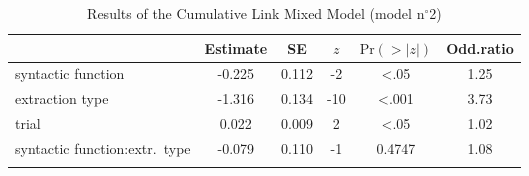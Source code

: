 \begin{table}
\begin{tabularx}{\textwidth}{Q S[table-format=-1.3] S[table-format=1.3] S[table-format=-2] S[table-format=<1.4] S[table-format=1.2]}
  \lsptoprule
 & {Estimate} & {SE} & {$z$} & {$\text{Pr}(>|z|)$} & {Odd.ratio} \\ 
  \midrule
  syntactic function & -0.225 & 0.112 & -2 & <.05 & 1.25 \\ 
  extraction type & -1.316 & 0.134 & -10 & <.001 & 3.73 \\ 
  trial & 0.022 & 0.009 & 2 & <.05 & 1.02 \\ 
  syntactic function:extr.\ type & -0.079 & 0.110 & -1 & 0.4747 & 1.08 \\ 
   \lspbottomrule
\end{tabularx}
\caption{Results of the Cumulative Link Mixed Model (model n$^{\circ}$2)}
\label{tab:exp07-m2}
\end{table}
